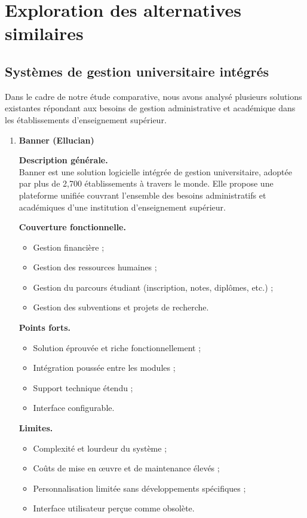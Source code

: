 \section{Exploration des alternatives similaires}

\subsection{Systèmes de gestion universitaire intégrés}

Dans le cadre de notre étude comparative, nous avons analysé plusieurs solutions existantes répondant aux besoins de gestion administrative et académique dans les établissements d'enseignement supérieur.

\begin{enumerate}[label=\alph*)]

\item \textbf{Banner (Ellucian)}

\textbf{Description générale.} \\
Banner est une solution logicielle intégrée de gestion universitaire, adoptée par plus de 2,700 établissements à travers le monde. Elle propose une plateforme unifiée couvrant l'ensemble des besoins administratifs et académiques d'une institution d'enseignement supérieur.

\textbf{Couverture fonctionnelle.}
\begin{itemize}
\item Gestion financière ;
\item Gestion des ressources humaines ;
\item Gestion du parcours étudiant (inscription, notes, diplômes, etc.) ;
\item Gestion des subventions et projets de recherche.
\end{itemize}

\textbf{Points forts.}
\begin{itemize}
\item Solution éprouvée et riche fonctionnellement ;
\item Intégration poussée entre les modules ;
\item Support technique étendu ;
\item Interface configurable.
\end{itemize}

\textbf{Limites.}
\begin{itemize}
\item Complexité et lourdeur du système ;
\item Coûts de mise en œuvre et de maintenance élevés ;
\item Personnalisation limitée sans développements spécifiques ;
\item Interface utilisateur perçue comme obsolète.
\end{itemize}


\end{enumerate}
